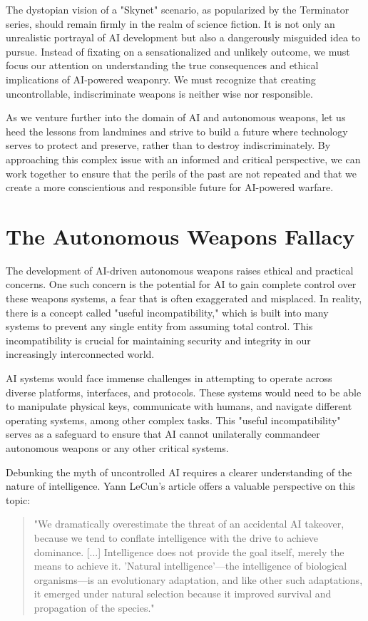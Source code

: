 The dystopian vision of a "Skynet" scenario, as popularized by the Terminator series, should remain firmly in the realm of science fiction. It is not only an unrealistic portrayal of AI development but also a dangerously misguided idea to pursue. Instead of fixating on a sensationalized and unlikely outcome, we must focus our attention on understanding the true consequences and ethical implications of AI-powered weaponry. We must recognize that creating uncontrollable, indiscriminate weapons is neither wise nor responsible.

As we venture further into the domain of AI and autonomous weapons, let us heed the lessons from landmines and strive to build a future where technology serves to protect and preserve, rather than to destroy indiscriminately. By approaching this complex issue with an informed and critical perspective, we can work together to ensure that the perils of the past are not repeated and that we create a more conscientious and responsible future for AI-powered warfare.

\section{The Autonomous Weapons Fallacy}

The development of AI-driven autonomous weapons raises ethical and practical concerns. One such concern is the potential for AI to gain complete control over these weapons systems, a fear that is often exaggerated and misplaced. In reality, there is a concept called "useful incompatibility," which is built into many systems to prevent any single entity from assuming total control. This incompatibility is crucial for maintaining security and integrity in our increasingly interconnected world.

AI systems would face immense challenges in attempting to operate across diverse platforms, interfaces, and protocols. These systems would need to be able to manipulate physical keys, communicate with humans, and navigate different operating systems, among other complex tasks. This "useful incompatibility" serves as a safeguard to ensure that AI cannot unilaterally commandeer autonomous weapons or any other critical systems.

Debunking the myth of uncontrolled AI requires a clearer understanding of the nature of intelligence. Yann LeCun's article \cite{dontfearterminator} offers a valuable perspective on this topic:

\begin{quote}
"We dramatically overestimate the threat of an accidental AI takeover, because we tend to conflate intelligence with the drive to achieve dominance. [...] Intelligence does not provide the goal itself, merely the means to achieve it. 'Natural intelligence'—the intelligence of biological organisms—is an evolutionary adaptation, and like other such adaptations, it emerged under natural selection because it improved survival and propagation of the species."
\end{quote}


